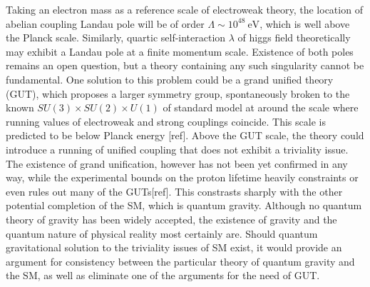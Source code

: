 \documentclass[11pt, a4paper]{article}
\newcommand{\jhkbf}[1]{\textbf{\color{red} [#1]}}
\begin{document}
Taking an electron mass as a reference scale of electroweak theory, the location of abelian coupling Landau pole 
will be of order $\Lambda \sim 10^{48} \ \text{eV}$, which is well above the Planck scale.
Similarly, quartic self-interaction $\lambda$ of higgs field theoretically may exhibit a Landau pole at a finite momentum scale.
Existence of both poles remains an open question, but a theory containing any such singularity cannot be fundamental.
One solution to this problem could be a grand unified theory (GUT), which proposes a larger symmetry group, spontaneously broken
to the known $SU(3)\times SU(2) \times U(1)$ of standard model at around the scale where running values of electroweak and strong couplings
coincide. This scale is predicted to be below Planck energy [ref]. Above the GUT scale, the theory could introduce
a running of unified coupling that does not exhibit a triviality issue.
The existence of grand unification, however has not been yet confirmed in any way, while the experimental bounds on the proton lifetime
heavily constraints or even rules out many of the GUTs[ref]. This constrasts sharply with the other potential completion of the SM,
which is quantum gravity. Although no quantum theory of gravity has been widely accepted, the existence of gravity and
the quantum nature of physical reality most certainly are. Should quantum gravitational solution to the triviality issues of SM exist,
it would provide an argument for consistency between the particular theory of quantum gravity and the SM, as well as eliminate one of the arguments for the need of GUT.
\end{document}
